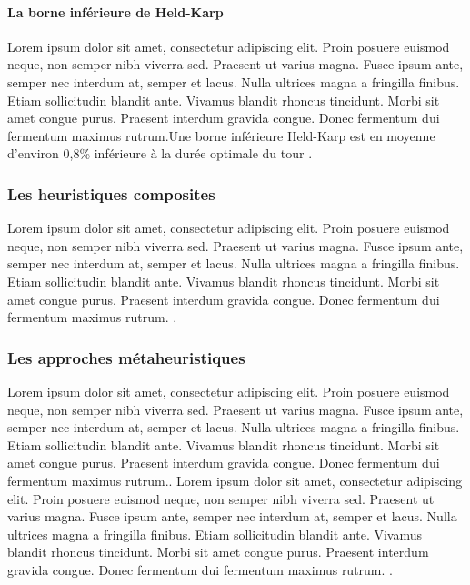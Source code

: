 \medskip

\paragraph{La borne inférieure de Held-Karp }
\label{held-karp}
Lorem ipsum dolor sit amet, consectetur adipiscing elit. Proin posuere euismod neque, non semper nibh viverra sed. Praesent ut varius magna. Fusce ipsum ante, semper nec interdum at, semper et lacus. Nulla ultrices magna a fringilla finibus. Etiam sollicitudin blandit ante. Vivamus blandit rhoncus tincidunt. Morbi sit amet congue purus. Praesent interdum gravida congue. Donec fermentum dui fermentum maximus rutrum.Une borne inférieure Held-Karp est en moyenne d'environ 0,8\% inférieure à la durée optimale du tour \parencite{johnson_asymptotic_1996}.

\medskip

\subsubsection{Les heuristiques composites}
Lorem ipsum dolor sit amet, consectetur adipiscing elit. Proin posuere euismod neque, non semper nibh viverra sed. Praesent ut varius magna. Fusce ipsum ante, semper nec interdum at, semper et lacus. Nulla ultrices magna a fringilla finibus. Etiam sollicitudin blandit ante. Vivamus blandit rhoncus tincidunt. Morbi sit amet congue purus. Praesent interdum gravida congue. Donec fermentum dui fermentum maximus rutrum. \parencite{golden_approximate_1980}.

\subsubsection{Les approches métaheuristiques}
Lorem ipsum dolor sit amet, consectetur adipiscing elit. Proin posuere euismod neque, non semper nibh viverra sed. Praesent ut varius magna. Fusce ipsum ante, semper nec interdum at, semper et lacus. Nulla ultrices magna a fringilla finibus. Etiam sollicitudin blandit ante. Vivamus blandit rhoncus tincidunt. Morbi sit amet congue purus. Praesent interdum gravida congue. Donec fermentum dui fermentum maximus rutrum.\parencite{blum_metaheuristics_2003}. Lorem ipsum dolor sit amet, consectetur adipiscing elit. Proin posuere euismod neque, non semper nibh viverra sed. Praesent ut varius magna. Fusce ipsum ante, semper nec interdum at, semper et lacus. Nulla ultrices magna a fringilla finibus. Etiam sollicitudin blandit ante. Vivamus blandit rhoncus tincidunt. Morbi sit amet congue purus. Praesent interdum gravida congue. Donec fermentum dui fermentum maximus rutrum. \parencite{bianchi_survey_2009}.

